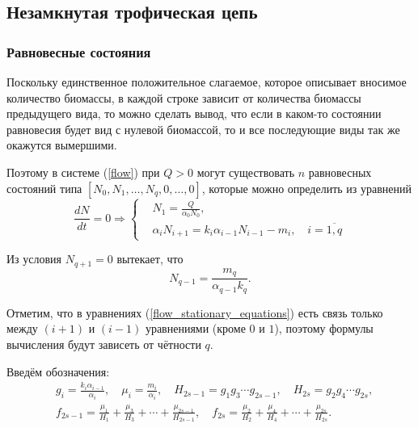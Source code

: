 \subsection{Незамкнутая трофическая цепь}
    \subsubsection{Равновесные состояния}
        Поскольку единственное положительное слагаемое, которое описывает вносимое количество биомассы, в каждой строке зависит от количества биомассы предыдущего вида, то можно сделать вывод, что если в каком-то состоянии равновесия будет вид с нулевой биомассой, то и все последующие виды так же окажутся вымершими.

        Поэтому в системе (\ref{flow}) при \(Q > 0\) могут существовать \( n \) равновесных состояний типа \(\left[ N_0, N_1, \ldots, N_q, 0, \ldots, 0 \right]\), которые можно определить из уравнений
        \begin{equation} \label{flow_stationary_equations}
            \frac{dN}{dt} = 0 \Rightarrow
            \left\lbrace\begin{split}
                & N_1 = \frac{Q}{\alpha_0 N_0}, \\
                & \alpha_i N_{i+1} = k_i \alpha_{i-1} N_{i-1} - m_i, \quad i=\overline{1,q}                
            \end{split}\right.
        \end{equation}

        Из условия \( N_{q+1} = 0 \) вытекает, что 
        \begin{equation}
            N_{q-1} = \frac{m_q}{\alpha_{q-1} k_q}.
        \end{equation}

        Отметим, что в уравнениях (\ref{flow_stationary_equations}) есть связь только между \((i+1)\) и \((i-1)\) уравнениями (кроме \(0\) и \(1\)), поэтому формулы вычисления будут зависеть от чётности \(q\).

        Введём обозначения:
        \begin{equation} \label{flow_sub}
            \begin{split}
            & g_i = \frac{k_i \alpha_{i-1}}{\alpha_i}, \quad \mu_i = \frac{m_i}{\alpha_i}, \quad
            H_{2s-1} = g_1 g_3 \cdots g_{2s-1}, \quad H_{2s} = g_2 g_4 \cdots g_{2s}, \\
            & f_{2s-1} = \frac{\mu_1}{H_1} + \frac{\mu_3}{H_3} + \cdots + \frac{\mu_{2s-1}}{H_{2s-1}}, \quad
            f_{2s} = \frac{\mu_2}{H_2} + \frac{\mu_4}{H_4} + \cdots + \frac{\mu_{2s}}{H_{2s}}.
            \end{split}
        \end{equation}

